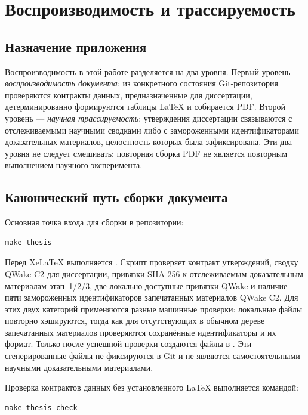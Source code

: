 \chapter{Воспроизводимость и трассируемость}
\label{app:reproducibility}

\section{Назначение приложения}

Воспроизводимость в этой работе разделяется на два уровня. Первый уровень ---
\emph{воспроизводимость документа}: из конкретного состояния Git-репозитория
проверяются контракты данных, предназначенные для диссертации,
детерминированно формируются таблицы LaTeX и собирается PDF. Второй уровень ---
\emph{научная трассируемость}: утверждения диссертации связываются с
отслеживаемыми научными сводками либо с замороженными идентификаторами
доказательных материалов, целостность которых была зафиксирована. Эти два
уровня не следует смешивать: повторная сборка PDF не является повторным
выполнением научного эксперимента.

\section{Канонический путь сборки документа}

Основная точка входа для сборки в репозитории:

\begin{verbatim}
make thesis
\end{verbatim}

Перед XeLaTeX выполняется . Скрипт
проверяет контракт утверждений, сводку QWake C2 для диссертации, привязки
SHA-256 к отслеживаемым доказательным материалам этап~1/2/3, две локально
доступные привязки QWake и наличие пяти замороженных идентификаторов
запечатанных материалов QWake C2. Для этих двух категорий применяются разные
машинные проверки: локальные файлы повторно хэшируются, тогда как для
отсутствующих в обычном дереве запечатанных материалов проверяются сохранённые
идентификаторы и их формат. Только после успешной проверки создаются файлы в
. Эти сгенерированные файлы не фиксируются в Git и не
являются самостоятельными научными доказательными материалами.

Проверка контрактов данных без установленного LaTeX выполняется командой:

\begin{verbatim}
make thesis-check
\end{verbatim}

